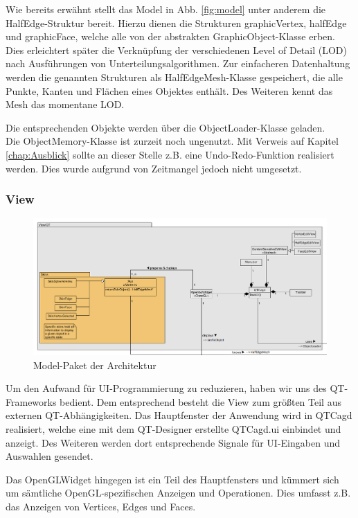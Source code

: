 Wie bereits erwähnt stellt das Model in Abb. \ref{fig:model} unter anderem die HalfEdge-Struktur bereit. Hierzu dienen die Strukturen graphicVertex, halfEdge und graphicFace, welche alle von der abstrakten GraphicObject-Klasse erben. 
Dies erleichtert später die Verknüpfung der verschiedenen Level of Detail (LOD) nach Ausführungen von Unterteilungsalgorithmen. 
Zur einfacheren Datenhaltung werden die genannten Strukturen als HalfEdgeMesh-Klasse gespeichert, die alle Punkte, Kanten und Flächen eines Objektes enthält. 
Des Weiteren kennt das Mesh das momentane LOD. 

Die entsprechenden Objekte werden über die ObjectLoader-Klasse geladen.\\

Die ObjectMemory-Klasse ist zurzeit noch ungenutzt. 
Mit Verweis auf Kapitel \ref{chap:Ausblick} sollte an dieser Stelle z.B. eine Undo-Redo-Funktion realisiert werden. 
Dies wurde aufgrund von Zeitmangel jedoch nicht umgesetzt.

\subsubsection{View}
\begin{figure}[htbp]
\includegraphics[angle=90,scale=0.6]{content/pictures/architekturView.png}
\caption{Model-Paket der Architektur}
\label{fig:view}
\end{figure}

Um den Aufwand für UI-Programmierung zu reduzieren, haben wir uns des QT-Frameworks bedient. 
Dem entsprechend besteht die View zum größten Teil aus externen QT-Abhängigkeiten. 
Das Hauptfenster der Anwendung wird in QTCagd realisiert, welche eine mit dem QT-Designer erstellte QTCagd.ui einbindet und anzeigt.
Des Weiteren werden dort entsprechende Signale für UI-Eingaben und Auswahlen gesendet.

Das OpenGLWidget hingegen ist ein Teil des Hauptfensters und kümmert sich um sämtliche OpenGL-spezifischen Anzeigen und Operationen.
Dies umfasst z.B. das Anzeigen von Vertices, Edges und Faces. 

